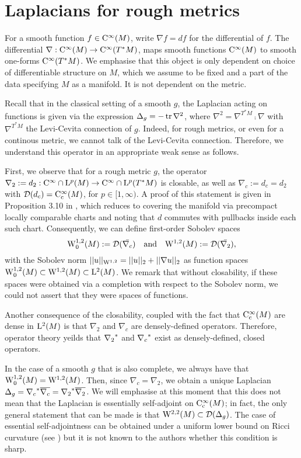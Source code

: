 \documentclass[a4paper, 12pt]{amsart}
\begin{document}
\section{Laplacians for rough metrics}


For a smooth function \(f \in \Ck{\infty}(M)\), write \(\nabla f = df\) for the differential of \(f\). 
The differential \(\nabla : \Ck{\infty}(M) \to \Ck{\infty}(T^{\ast} M)\), maps smooth functions 
\(\Ck{\infty}(M)\) to smooth one-forms \(\Ck{\infty}(T^{\ast} M)\). 
We emphasise that this object is only dependent on choice of differentiable structure on $M$,
which we assume to be fixed and a part of the data specifying $M$ as a manifold. 
It is not dependent on the metric.

Recall that in the classical setting of a smooth $g$,  the Laplacian acting on functions 
is given  via the expression $\Delta_g = - \tr \nabla^2$, where $\nabla^2 = \nabla^{T^\ast M} \comp \nabla$
with $\nabla^{T^\ast M}$ the Levi-Cevita connection of $g$. Indeed, for rough metrics, 
or even for a continous metric, we cannot talk of the Levi-Cevita connection. 
Therefore, we understand this operator in an appropriate weak sense as follows.

First, we observe that for a rough metric $g$, the operator
$\nabla_2 := d_2: \Ck{\infty} \cap \Lp{p}(M) \to \Ck{\infty} \cap \Lp{p}(T^\ast M)$
is closable, as well as $\nabla_c := d_c = d_2$ with $\dom(d_c) = \Ck[c]{\infty}(M)$,
for $p \in [1, \infty)$. A proof of this statement is given in Proposition 3.10 in \cite{BRough}, 
which reduces to covering the manifold via precompact locally comparable
charts and noting that $d$ commutes with pullbacks inside each such chart. 
Consequently, we can define first-order Sobolev spaces
$$ \SobH[0]{1}(M) := \dom(\bar{\nabla_c})\quad \text{and}\quad  \SobH{1}(M) := \dom(\bar{\nabla_2}),$$
with the Sobolev norm $||u||_{\SobH{1}} = ||u||_2 + ||\nabla u||_2$
as function spaces $\SobH[0]{1}(M) \subset \SobH{1}(M) \subset \Lp{2}(M)$.
We remark that without closability, if these spaces were obtained
via a completion with respect to the Sobolev norm, we could not 
assert that they were spaces of functions.

Another consequence of the closability, coupled with the 
fact that $\Ck[c]{\infty}(M)$ are dense in $\Lp{2}(M)$ 
is that $\nabla_2$ and $\nabla_c$ are densely-defined
operators. Therefore, operator theory yeilds 
that $\adj{\nabla_2}$ and $\adj{\nabla_c}$ exist
as densely-defined, closed operators.


In the case of a smooth $g$ that is also complete, we
always have that $\SobH[0]{1}(M) = \SobH{1}(M)$. 
Then, since $\nabla_c = \nabla_2$, we obtain 
a unique Laplacian $\Delta_g = \adj{\nabla_c} \close{\nabla_c} = \adj{\nabla_2}\close{\nabla_2}$.
We will emphasise at this moment that this does not mean that 
the Laplacian is essentially self-adjoint on $\Ck[c]{\infty}(M)$; in 
fact, the only general statement that can be made is that
$\SobH{2}(M) \subset \dom(\Delta_g)$. The 
case of essential self-adjointness can
be obtained under a uniform lower bound on Ricci
curvature (see \cite{BDensity}) but it
is not known to the authors whether this condition is sharp.
\end{document}
